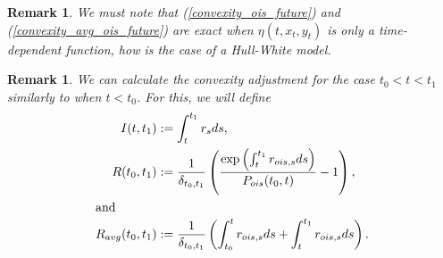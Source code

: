 \documentclass[a4paper,10pt]{article}
\newtheorem{remark}[theorem]{Remark}
\newcommand{\1}{\mathbf{1}}
\begin{document}
\begin{remark}
We must note that (\ref{convexity_ois_future}) and (\ref{convexity_avg_ois_future}) are exact when $\eta(t,x_t, y_t)$ is only a time-dependent function, how is the case of a Hull-White model.
\end{remark}

\begin{remark}
We can calculate the convexity adjustment for the case $t_0 < t < t_1$ similarly to when $t < t_0$. For this, we will define
\begin{align*}
I(t,t_1)&:=\int_{t}^{t_1} r_s ds,\\
R(t_0,t_1) &:= \frac{1}{\delta_{t_0,t_1}}\left(\frac{\exp\left(\int_{t}^{t_1} r_{ois,s} ds\right)}{P_{ois}(t_0,t)} - 1\right), \\
\intertext{and}
R_{avg}(t_0,t_1) &:= \frac{1}{\delta_{t_0,t_1}}\left(\int_{t_0}^{t} r_{ois,s} ds + \int_{t}^{t_1} r_{ois,s} ds\right).   
\end{align*}
\end{remark}
\end{document}
